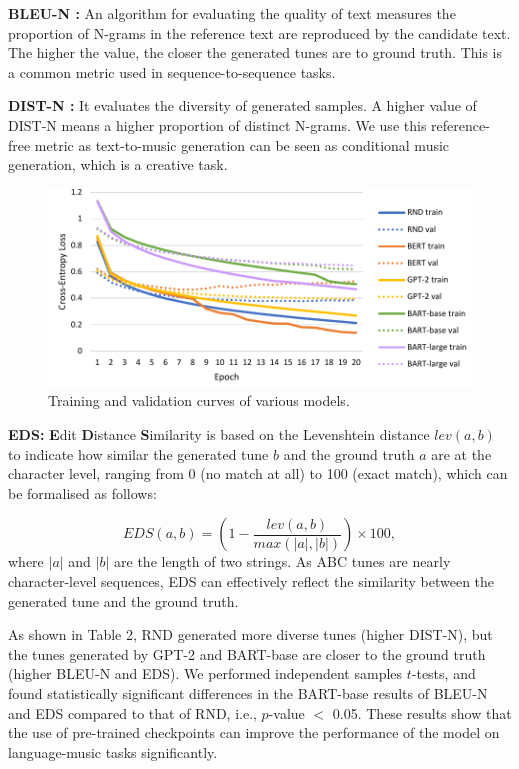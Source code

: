 \documentclass[letterpaper]{article} %
\begin{document}
\textbf{BLEU-N \cite{papineni-etal-2002-bleu}:} An algorithm for evaluating the quality of text measures the proportion of N-grams in the reference text are reproduced by the candidate text. The higher the value, the closer the generated tunes are to ground truth. This is a common metric used in sequence-to-sequence tasks.

\textbf{DIST-N \cite{DBLP:conf/naacl/LiGBGD16}:} It evaluates the diversity of generated samples. A higher value of DIST-N means a higher proportion of distinct N-grams. We use this reference-free metric as text-to-music generation can be seen as conditional music generation, which is a creative task.

\begin{figure}[t]
\centering
\begin{minipage}{8.5cm}
\includegraphics[width=\textwidth]{fig1.pdf}
\end{minipage}
\centering
\caption{Training and validation curves of various models.}
\end{figure}

\textbf{EDS:} \textbf{E}dit \textbf{D}istance \textbf{S}imilarity is based on the Levenshtein distance $lev(a,b)$ to indicate how similar the generated tune $b$ and the ground truth $a$ are at the character level, ranging from 0 (no match at all) to 100 (exact match), which can be formalised as follows:

\begin{equation}
EDS(a,b) = (1 - \frac{lev(a,b)}{max(|a|,|b|)})\times 100,
\end{equation}
\noindent
where $|a|$ and $|b|$ are the length of two strings. As ABC tunes are nearly character-level sequences, EDS can effectively reflect the similarity between the generated tune and the ground truth.

As shown in Table 2, RND generated more diverse tunes (higher DIST-N), but the tunes generated by GPT-2 and BART-base are closer to the ground truth (higher BLEU-N and EDS). We performed independent samples $t$-tests, and found statistically significant differences in the BART-base results of BLEU-N and EDS compared to that of RND, i.e., $p$-value $<$ 0.05. These results show that the use of pre-trained checkpoints can improve the performance of the model on language-music tasks significantly.
\end{document}
